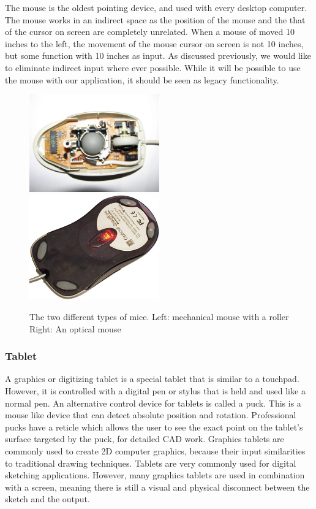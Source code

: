 \documentclass[11pt]{report}
\begin{document}
 The mouse is the oldest pointing device, and used with every desktop computer.
 The mouse works in an indirect space as the position of the mouse and the that of the cursor on screen are completely unrelated.
 When a mouse of moved 10 inches to the left, the movement of the mouse cursor on screen is not 10 inches, but some function with 10 inches as input.
 As discussed previously, we would like to eliminate indirect input where ever possible.
 While it will be possible to use the mouse with our application, it should be seen as legacy functionality.
 
 \begin{figure}
 \includegraphics[width=0.5\textwidth]{mechmouse}
 \includegraphics[width=0.5\textwidth]{opticalmouse}
 \caption{The two different types of mice. Left: mechanical mouse with a roller Right: An optical mouse}
 \end{figure}
 
 \subsubsection{Tablet}
 A graphics or digitizing tablet is a special tablet that is similar to a touchpad. 
 However, it is controlled with a digital pen or stylus that is held and used like a normal pen.
 An alternative control device for tablets is called a puck. 
 This is a mouse like device that can detect absolute position and rotation.
 Professional pucks have a reticle which allows the user to see the exact point on the tablet's surface targeted by the puck, for detailed CAD work.
 Graphics tablets are commonly used to create 2D computer graphics, because their input similarities to traditional drawing techniques.
 Tablets are very commonly used for digital sketching applications.
 However, many graphics tablets are used in combination with a screen, meaning there is still a visual and physical disconnect between the sketch and the output.
 
\end{document}
